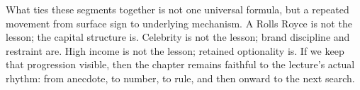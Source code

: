 What ties these segments together is not one universal formula, but a repeated movement from surface sign to underlying mechanism. A Rolls Royce is not the lesson; the capital structure is. Celebrity is not the lesson; brand discipline and restraint are. High income is not the lesson; retained optionality is. If we keep that progression visible, then the chapter remains faithful to the lecture's actual rhythm: from anecdote, to number, to rule, and then onward to the next search.